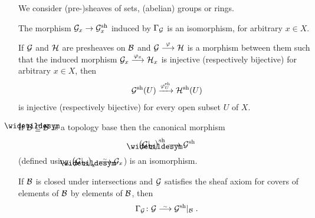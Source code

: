 \documentclass[a4paper,parskip=half,numbers=enddot, DIV=12]{scrreprt}
\begin{document}
\begin{prop}
    We consider (pre-)sheaves of sets, (abelian) groups or rings.
    \begin{alphanumerate}
      \item 
        The morphism $\Gg_x \morphism \Gg^\sh_x$ induced by $\Gamma_{\mathcal{G}}$ is an isomorphism, for arbitrary $x\in X$.
      \item
        If $\mathcal{G}$ and $\mathcal{H}$ are presheaves on $\mathcal{B}$ and $\Gg\morphism[\phi] \Hh$ is a morphism between them such that the induced morphism $\Gg_x\morphism[\phi_x] \Hh_x$ is injective (respectively bijective) for arbitrary $x\in X$, then  
        \begin{align*}
            \mathcal{G}^{\mathrm{sh}}(U) \xrightarrow{\varphi_U^{\mathrm{sh}}} \mathcal{H}^{\mathrm{sh}}(U)
        \end{align*}
        is injective (respectively bijective) for every open subset $U$ of $X$.
      \item 
        If $\snake \Bb \subseteq \Bb$ is a topology base then the canonical morphism \begin{align*}
        	\big(\Gg|_{\snake\Bb}\big) ^\sh\morphism \Gg^\sh
        \end{align*}
        (defined using $\big(\Gg|_{\snake\Bb}\big)_x \isomorphism \Gg_x$)  is an isomorphism.
      \item 
        If $\mathcal{B}$ is closed under intersections and $\mathcal{G}$ satisfies the sheaf axiom for covers of elements of $\mathcal{B}$ by elements of $\mathcal{B}$, then 
        \begin{align*}
        	\Gamma_\Gg\colon \Gg\isomorphism \Gg^\sh|_\Bb\;.
        \end{align*}
    \end{alphanumerate}
\end{prop}
\end{document}
